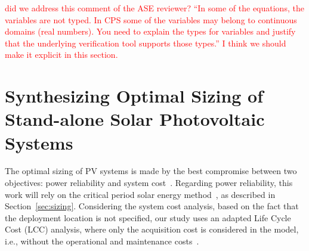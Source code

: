 \documentclass[runningheads]{llncs}
\begin{document}
\textcolor{red}{did we address this comment of the ASE reviewer? ``In some of the equations, the variables are not typed. In CPS some of the variables may belong to continuous domains (real numbers). You need to explain the types for variables and justify that the underlying verification tool supports those types.'' I think we should make it explicit in this section.}

\section{Synthesizing Optimal Sizing of Stand-alone Solar Photovoltaic Systems}

The optimal sizing of PV systems is made by the best compromise between two objectives: power reliability and system cost~\cite{Alsadi2018}. 
Regarding power reliability, this work will rely on the critical period solar energy method~\cite{Pinho}, as described in Section~\ref{sec:sizing}. 
Considering the system cost analysis, based on the fact that the deployment location is not specified, our study uses an adapted Life Cycle Cost (LCC) analysis, where only the acquisition cost is considered in the model, i.e., without the operational and maintenance costs~\cite{Alsadi2018}.
\end{document}
